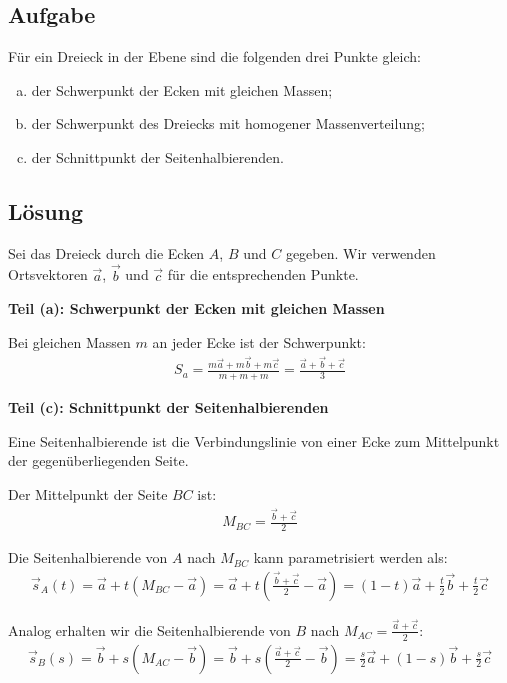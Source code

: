 \documentclass{article}
\begin{document}
\subsection*{Aufgabe}
Für ein Dreieck in der Ebene sind die folgenden drei Punkte gleich:

\begin{enumerate}[(a)]
    \item der Schwerpunkt der Ecken mit gleichen Massen;
    \item der Schwerpunkt des Dreiecks mit homogener Massenverteilung;
    \item der Schnittpunkt der Seitenhalbierenden.
\end{enumerate}

\subsection*{Lösung}

Sei das Dreieck durch die Ecken $A$, $B$ und $C$ gegeben. Wir verwenden Ortsvektoren $\vec{a}$, $\vec{b}$ und $\vec{c}$ für die entsprechenden Punkte.

\textbf{Teil (a): Schwerpunkt der Ecken mit gleichen Massen}

Bei gleichen Massen $m$ an jeder Ecke ist der Schwerpunkt:
\begin{align}
S_a = \frac{m\vec{a} + m\vec{b} + m\vec{c}}{m + m + m} = \frac{\vec{a} + \vec{b} + \vec{c}}{3}
\end{align}

\textbf{Teil (c): Schnittpunkt der Seitenhalbierenden}

Eine Seitenhalbierende ist die Verbindungslinie von einer Ecke zum Mittelpunkt der gegenüberliegenden Seite.

Der Mittelpunkt der Seite $BC$ ist:
\begin{align}
M_{BC} = \frac{\vec{b} + \vec{c}}{2}
\end{align}

Die Seitenhalbierende von $A$ nach $M_{BC}$ kann parametrisiert werden als:
\begin{align}
\vec{s}_A(t) = \vec{a} + t(M_{BC} - \vec{a}) = \vec{a} + t\left(\frac{\vec{b} + \vec{c}}{2} - \vec{a}\right) = (1-t)\vec{a} + \frac{t}{2}\vec{b} + \frac{t}{2}\vec{c}
\end{align}

Analog erhalten wir die Seitenhalbierende von $B$ nach $M_{AC} = \frac{\vec{a} + \vec{c}}{2}$:
\begin{align}
\vec{s}_B(s) = \vec{b} + s(M_{AC} - \vec{b}) = \vec{b} + s\left(\frac{\vec{a} + \vec{c}}{2} - \vec{b}\right) = \frac{s}{2}\vec{a} + (1-s)\vec{b} + \frac{s}{2}\vec{c}
\end{align}
\end{document}
